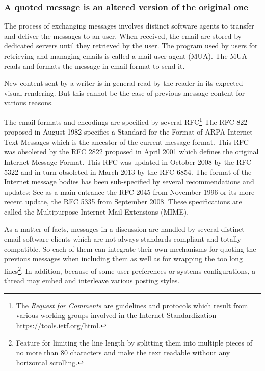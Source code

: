 \subsubsection{A quoted message is an altered version of the original one}
\label{}


The process of exchanging messages involves distinct software agents to transfer and deliver the messages to an user. %
When received, the email are stored by dedicated servers until they retrieved by the user.
%
The program used by users for retrieving and managing emails is called a mail user agent (MUA). 
The MUA reads and formats the message in email format to send it.

New content sent by a writer is in general read by the reader in its expected visual rendering. 
But this cannot be the case of previous message content for various reasons.



The email %
formats and encodings are specified by several RFC\footnote{The \textit{Request for Comments} are guidelines and protocols which result from various working groups involved in the Internet Standardization \url{https://tools.ietf.org/html}.}
%
The RFC 822 proposed in August 1982 specifies a Standard for the Format of ARPA Internet Text Messages which is the ancestor of the current message format. This RFC was obsoleted by the RFC 2822  proposed in April 2001 which defines the original Internet Message Format. This RFC was updated in October 2008 by the RFC 5322 and in turn obsoleted in March 2013 by the RFC 6854.
%
The format of the Internet message bodies has been sub-specified by several recommendations and updates; See as a main entrance the RFC 2045 from November 1996 or its more recent update, the RFC 5335 from September 2008. These specifications are called the Multipurpose Internet Mail Extensions (MIME).



As a matter of facts, messages in a discussion are handled by several distinct email software clients which are not always standards-compliant and totally compatible.
So each of them can integrate their own mechanisms 
for quoting the previous messages when including them as well as 
for wrapping the too long lines\footnote{Feature for limiting the line length by splitting them into multiple pieces of no more than 80 characters and make the text readable without any horizontal scrolling.}.
%
In addition, because of some user preferences or systems configurations, a thread may embed and interleave various posting styles.  


